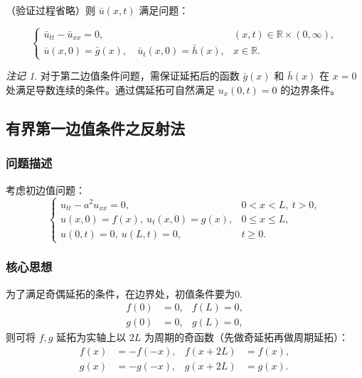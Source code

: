 \documentclass[12pt,a4paper]{article}
\numberwithin{subsection}{section}   %
\numberwithin{subsubsection}{subsection}
\theoremstyle{plain}
\theoremstyle{definition}
\theoremstyle{remark}
\newtheorem{remark}[theorem]{注记}
\theoremstyle{remark}
\begin{document}
		（验证过程省略）则 \(\bar{u}(x, t)\) 满足问题：
		
		\begin{equation}
			\begin{cases}
				\bar{u}_{tt} - \bar{u}_{xx} = 0, & (x, t) \in \mathbb{R} \times (0, \infty), \\
				\bar{u}(x, 0) = \bar{g}(x), \quad \bar{u}_t(x, 0) = \bar{h}(x), & x \in \mathbb{R}.
			\end{cases}
		\end{equation}
		
		\begin{remark}
			对于第二边值条件问题，需保证延拓后的函数 \(\bar{g}(x)\) 和 \(\bar{h}(x)\) 在 \(x=0\) 处满足导数连续的条件。通过偶延拓可自然满足 \(u_x(0,t) = 0\) 的边界条件。
		\end{remark}
	
	
\subsection{有界第一边值条件之反射法}

\subsubsection{问题描述}
考虑初边值问题：
\begin{equation}
	\begin{cases}
		u_{tt} - a^2 u_{xx} = 0, & 0 < x < L, \ t > 0, \\
		u(x, 0) = f(x), \ u_t(x, 0) = g(x), & 0 \leq x \leq L, \\
		u(0, t) = 0, \ u(L, t) = 0, & t \geq 0.
	\end{cases}
\end{equation}


\subsubsection{核心思想}
为了满足奇偶延拓的条件，在边界处，初值条件要为0.
\begin{equation}
	\begin{aligned}
		f(0) & = 0, & f(L)  = 0, \\
		g(0) & =0, & g(L)  = 0,
	\end{aligned}
\end{equation}
则可将 \(f, g\) 延拓为实轴上以 \(2L\) 为周期的奇函数（先做奇延拓再做周期延拓）：
\begin{equation}
	\begin{aligned}
		f(x) &= -f(-x), & f(x + 2L) &= f(x), \\
		g(x) &= -g(-x), & g(x + 2L) &= g(x).
	\end{aligned}
\end{equation}
\end{document}
